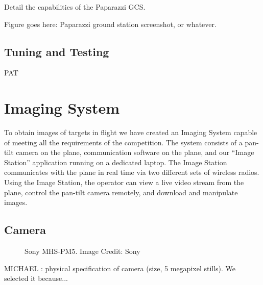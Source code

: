 \documentclass[10pt]{report}
\begin{document}
Detail the capabilities of the Paparazzi GCS.

Figure goes here: Paparazzi ground station screenshot, or whatever. 
\subsection{Tuning and Testing}
PAT

\section{Imaging System}

To obtain images of targets in flight we have created an Imaging System capable of meeting all the requirements of the competition.  The system consists of a pan-tilt camera on the plane, communication software on the plane, and our ``Image Station'' application running on a dedicated laptop.  The Image Station communicates with the plane in real time via two different sets of wireless radios.  Using the Image Station, the operator can view a live video stream from the plane, control the pan-tilt camera remotely, and download and manipulate images.

\subsection{Camera}
\begin{figure}
	\centering
	\caption{Sony MHS-PM5. Image Credit: Sony}
	\label{fig:camera}
\end{figure}
MICHAEL : physical specification of camera (size, 5 megapixel stills). We selected it because...
\end{document}
